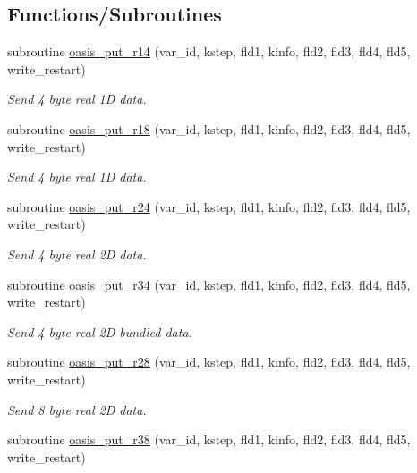 \subsection*{Functions/\+Subroutines}
\begin{DoxyCompactItemize}
\item 
subroutine \hyperlink{namespacemod__oasis__getput__interface_af2487e50b549830a14e5517c0736f907}{oasis\+\_\+put\+\_\+r14} (var\+\_\+id, kstep, fld1, kinfo, fld2, fld3, fld4, fld5, write\+\_\+restart)
\begin{DoxyCompactList}\small\item\em Send 4 byte real 1D data. \end{DoxyCompactList}\item 
subroutine \hyperlink{namespacemod__oasis__getput__interface_a70e218d2524977cbd4e6c010b6a222cc}{oasis\+\_\+put\+\_\+r18} (var\+\_\+id, kstep, fld1, kinfo, fld2, fld3, fld4, fld5, write\+\_\+restart)
\begin{DoxyCompactList}\small\item\em Send 4 byte real 1D data. \end{DoxyCompactList}\item 
subroutine \hyperlink{namespacemod__oasis__getput__interface_a6b5add4ec9bd054279451a5bb52f7d32}{oasis\+\_\+put\+\_\+r24} (var\+\_\+id, kstep, fld1, kinfo, fld2, fld3, fld4, fld5, write\+\_\+restart)
\begin{DoxyCompactList}\small\item\em Send 4 byte real 2D data. \end{DoxyCompactList}\item 
subroutine \hyperlink{namespacemod__oasis__getput__interface_acc31c8501b46f19ac866726af9baf017}{oasis\+\_\+put\+\_\+r34} (var\+\_\+id, kstep, fld1, kinfo, fld2, fld3, fld4, fld5, write\+\_\+restart)
\begin{DoxyCompactList}\small\item\em Send 4 byte real 2D bundled data. \end{DoxyCompactList}\item 
subroutine \hyperlink{namespacemod__oasis__getput__interface_a73cdc18cf8e76acb003451e737fab7fe}{oasis\+\_\+put\+\_\+r28} (var\+\_\+id, kstep, fld1, kinfo, fld2, fld3, fld4, fld5, write\+\_\+restart)
\begin{DoxyCompactList}\small\item\em Send 8 byte real 2D data. \end{DoxyCompactList}\item 
subroutine \hyperlink{namespacemod__oasis__getput__interface_a6e458b3434ebc22a8c0a6de7d2b6328f}{oasis\+\_\+put\+\_\+r38} (var\+\_\+id, kstep, fld1, kinfo, fld2, fld3, fld4, fld5, write\+\_\+restart)

\end{DoxyCompactItemize}
